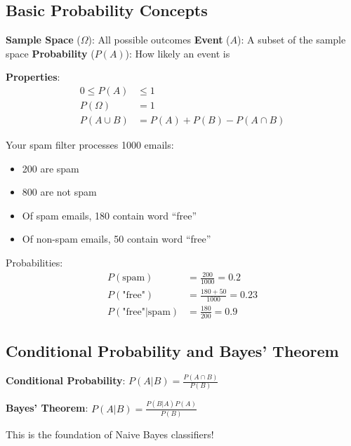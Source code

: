 \documentclass{article}
\newcounter{example}
\begin{document}
\subsection{Basic Probability Concepts}

\textbf{Sample Space} ($\Omega$): All possible outcomes
\textbf{Event} ($A$): A subset of the sample space
\textbf{Probability} ($P(A)$): How likely an event is

\textbf{Properties}:
\begin{align}
0 \leq P(A) &\leq 1 \\
P(\Omega) &= 1 \\
P(A \cup B) &= P(A) + P(B) - P(A \cap B)
\end{align}

\begin{tcolorbox}[colback=red!5!white,colframe=red!75!black,title=Example \stepcounter{example}\#\theexample: Email Classification]
Your spam filter processes 1000 emails:
\begin{itemize}
    \item 200 are spam
    \item 800 are not spam
    \item Of spam emails, 180 contain word ``free''
    \item Of non-spam emails, 50 contain word ``free''
\end{itemize}

Probabilities:
\begin{align}
P(\text{spam}) &= \frac{200}{1000} = 0.2 \\
P(\text{"free"}) &= \frac{180 + 50}{1000} = 0.23 \\
P(\text{"free"}|\text{spam}) &= \frac{180}{200} = 0.9
\end{align}
\end{tcolorbox}

\subsection{Conditional Probability and Bayes' Theorem}

\textbf{Conditional Probability}: $P(A|B) = \frac{P(A \cap B)}{P(B)}$

\textbf{Bayes' Theorem}: $P(A|B) = \frac{P(B|A) P(A)}{P(B)}$

This is the foundation of Naive Bayes classifiers!

\begin{center}
\end{center}
\end{document}
